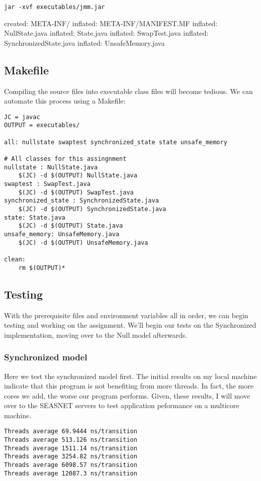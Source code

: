 \documentclass[11pt]{article}
\begin{document}
\begin{verbatim}
jar -xvf executables/jmm.jar
\end{verbatim}
created:   META-INF/              
inflated:  META-INF/MANIFEST.MF   
inflated:  NullState.java         
inflated:  State.java             
inflated:  SwapTest.java          
inflated:  SynchronizedState.java 
inflated:  UnsafeMemory.java      
\subsection{Makefile}
\label{sec-3-2}
Compiling the source files into executable class files will become tedious.
We can automate this process using a Makefile:

\begin{verbatim}
JC = javac
OUTPUT = executables/

all: nullstate swaptest synchronized_state state unsafe_memory

# All classes for this assingnment
nullstate : NullState.java
	$(JC) -d $(OUTPUT) NullState.java
swaptest : SwapTest.java
	$(JC) -d $(OUTPUT) SwapTest.java
synchronized_state : SynchronizedState.java
	$(JC) -d $(OUTPUT) SynchronizedState.java
state: State.java
	$(JC) -d $(OUTPUT) State.java
unsafe_memory: UnsafeMemory.java
	$(JC) -d $(OUTPUT) UnsafeMemory.java

clean:
	rm $(OUTPUT)*
\end{verbatim}
\subsection{Testing}
\label{sec-3-3}
With the prerequisite files and environment variables all in order, we
can begin testing and working on the assignment. We'll begin our tests
on the Synchronized implementation, moving over to the Null model
afterwards.
\subsubsection{Synchronized model}
\label{sec-3-3-1}
Here we test the synchronized model first. The initial results on my
local machine indicate that this program is not benefiting from more
threads. In fact, the more cores we add, the worse our program
performs. Given, these results, I will move over to the SEASNET
servers to test application peformance on a multicore machine.

\begin{verbatim}
Threads average 69.9444 ns/transition
Threads average 513.126 ns/transition
Threads average 1511.14 ns/transition
Threads average 3254.82 ns/transition
Threads average 6098.57 ns/transition
Threads average 12087.3 ns/transition
\end{verbatim}
\end{document}
